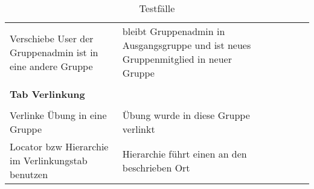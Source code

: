 \begin{table}[]
	\centering
	\caption{Testfälle}
	\label{table3}
	\begin{tabular}{p{6cm}p{7cm}p{3cm}llll}Verschiebe User der Gruppenadmin ist in eine andere Gruppe                                                                           & bleibt Gruppenadmin in Ausgangsgruppe und ist neues Gruppenmitglied in neuer Gruppe                                                                              & \checkmark          &  &  &  \\
		&                                                                                                                                                                  &             &  &  &  \\
		\textbf{	Tab Verlinkung  }                                                                                                                     &                                                                                                                                                                  &             &  &  &  \\
			&                                                                                                                                                                  &             &  &  &  \\
		Verlinke Übung in eine Gruppe                                                                                                        & Übung wurde in diese Gruppe verlinkt                                                                                                                             & \checkmark           &  &  &  \\
		Locator bzw Hierarchie im Verlinkungstab benutzen                                                                                    & Hierarchie führt einen an den beschrieben Ort                                                                                                                    & \checkmark           &  &  &  \\
		

\end{tabular}
\end{table}
